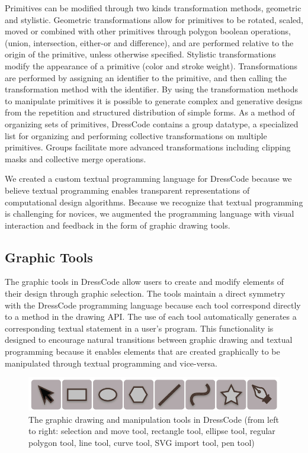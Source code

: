 \documentclass{sigchi}
\begin{document}
Primitives can be modified through two kinds transformation methods, geometric and stylistic. Geometric transformations allow for primitives to be rotated, scaled, moved or combined with other primitives through polygon boolean operations, (union, intersection, either-or and difference), and are performed relative to the origin of the primitive, unless otherwise specified. Stylistic transformations modify the appearance of a primitive (color and stroke weight). Transformations are performed by assigning an identifier to the primitive, and then calling the transformation method with the identifier. By using the transformation methods to manipulate primitives it is possible to generate complex and generative designs from the repetition and structured distribution of simple forms. As a method of organizing sets of primitives, DressCode contains a group datatype, a specialized list for organizing and performing collective transformations on multiple primitives. Groups facilitate more advanced transformations including clipping masks and collective merge operations. 

We created a custom textual programming language for DressCode because we believe textual programming enables transparent representations of computational design algorithms. Because we recognize that textual programming is challenging for novices, we augmented the programming language with visual interaction and feedback in the form of graphic drawing tools.
 
\subsection{Graphic Tools}
\label{subsec:graphic_tools_test}
The graphic tools in DressCode allow users to create and modify elements of their design through graphic selection. The tools maintain a direct symmetry with the DressCode programming language because each tool correspond directly to a method in the drawing API. The use of each tool automatically generates a corresponding textual statement in a user's program. This functionality is designed to encourage natural transitions between graphic drawing and textual programming because it enables elements that are created graphically to be manipulated through textual programming and vice-versa.

\begin{center}
\begin{figure}[h!]
\includegraphics[width=0.75\columnwidth]{images/graphic_tools.jpg}
\caption{The graphic drawing and manipulation tools in DressCode (from left to right: selection and move tool, rectangle tool, ellipse tool, regular polygon tool, line tool, curve tool, SVG import tool, pen tool)}
\label{fig:graphic_tools}
\end{figure}
\end{center}
\vspace{-20pt}
\end{document}
